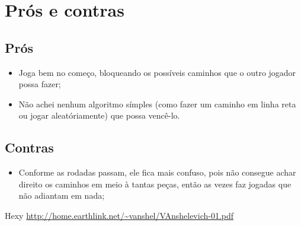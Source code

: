 \documentclass[12pt, a4paper]{article} %
\begin{document}
\section{Prós e contras}
	\subsection{Prós}
	\begin{itemize}
		\item Joga bem no começo, bloqueando os possíveis caminhos que o outro jogador possa fazer;
		\item Não achei nenhum algoritmo símples (como fazer um caminho em linha reta ou jogar aleatóriamente) que possa vencê-lo.
	\end{itemize}
	\subsection{Contras}
	\begin{itemize}
		\item Conforme as rodadas passam, ele fica mais confuso, pois não consegue achar direito os caminhos em meio à tantas peças, então as vezes faz jogadas que não adiantam em nada;
	\end{itemize}
\begin{thebibliography}{1}
 Hexy \url{http://home.earthlink.net/~vanshel/VAnshelevich-01.pdf}
\end{thebibliography}
\end{document}
